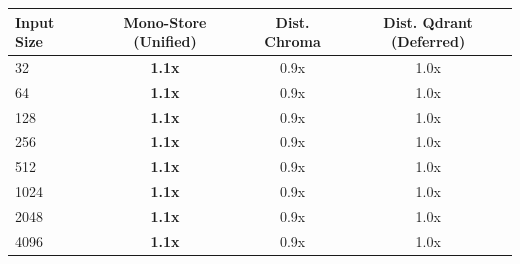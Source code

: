 \begin{tabular}{lccc}
\toprule
\textbf{Input Size} & \textbf{Mono-Store (Unified)} & \textbf{Dist. Chroma} & \textbf{Dist. Qdrant (Deferred)} \\
\midrule
32 & \textbf{1.1x} & 0.9x & 1.0x \\
64 & \textbf{1.1x} & 0.9x & 1.0x \\
128 & \textbf{1.1x} & 0.9x & 1.0x \\
256 & \textbf{1.1x} & 0.9x & 1.0x \\
512 & \textbf{1.1x} & 0.9x & 1.0x \\
1024 & \textbf{1.1x} & 0.9x & 1.0x \\
2048 & \textbf{1.1x} & 0.9x & 1.0x \\
4096 & \textbf{1.1x} & 0.9x & 1.0x \\
\bottomrule
\end{tabular}
